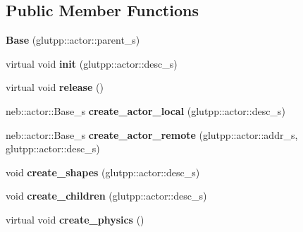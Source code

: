 \subsection*{Public Member Functions}
\begin{DoxyCompactItemize}
\item 
\hypertarget{classneb_1_1Actor_1_1Base_a1c132ea7e1da3f97014260811b207aa9}{
{\bfseries Base} (glutpp::actor::parent\_\-s)}
\label{classneb_1_1Actor_1_1Base_a1c132ea7e1da3f97014260811b207aa9}

\item 
\hypertarget{classneb_1_1Actor_1_1Base_a65eef87d34b8057b22bd15b205712563}{
virtual void {\bfseries init} (glutpp::actor::desc\_\-s)}
\label{classneb_1_1Actor_1_1Base_a65eef87d34b8057b22bd15b205712563}

\item 
\hypertarget{classneb_1_1Actor_1_1Base_a85a2befeafb0bdfaa6fc8e9272e90df6}{
virtual void {\bfseries release} ()}
\label{classneb_1_1Actor_1_1Base_a85a2befeafb0bdfaa6fc8e9272e90df6}

\item 
\hypertarget{classneb_1_1Actor_1_1Base_abead527b024de26be27c3bd447e809bd}{
neb::actor::Base\_\-s {\bfseries create\_\-actor\_\-local} (glutpp::actor::desc\_\-s)}
\label{classneb_1_1Actor_1_1Base_abead527b024de26be27c3bd447e809bd}

\item 
\hypertarget{classneb_1_1Actor_1_1Base_a436a0f3b2d0d1e219cca30ca06fd7921}{
neb::actor::Base\_\-s {\bfseries create\_\-actor\_\-remote} (glutpp::actor::addr\_\-s, glutpp::actor::desc\_\-s)}
\label{classneb_1_1Actor_1_1Base_a436a0f3b2d0d1e219cca30ca06fd7921}

\item 
\hypertarget{classneb_1_1Actor_1_1Base_a6e95803867800fb5e1c9f79ea58c1457}{
void {\bfseries create\_\-shapes} (glutpp::actor::desc\_\-s)}
\label{classneb_1_1Actor_1_1Base_a6e95803867800fb5e1c9f79ea58c1457}

\item 
\hypertarget{classneb_1_1Actor_1_1Base_a66decc98c424ebc2fa8a13d57ef1ccf6}{
void {\bfseries create\_\-children} (glutpp::actor::desc\_\-s)}
\label{classneb_1_1Actor_1_1Base_a66decc98c424ebc2fa8a13d57ef1ccf6}

\item 
\hypertarget{classneb_1_1Actor_1_1Base_a03d72471ba01b7c7df310e02173240e0}{
virtual void {\bfseries create\_\-physics} ()}
\label{classneb_1_1Actor_1_1Base_a03d72471ba01b7c7df310e02173240e0}


\end{DoxyCompactItemize}
